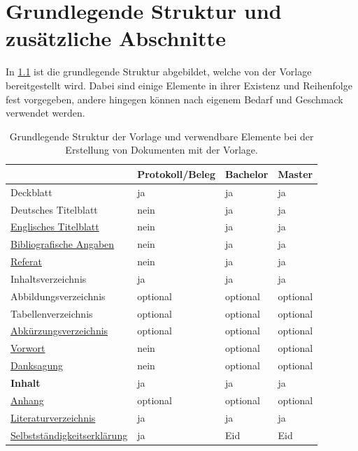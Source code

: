 	
\chapter{Grundlegende Struktur und zusätzliche Abschnitte}
\label{cha:additionalChapters}
In \cref{tab:documentStructure} ist die grundlegende Struktur abgebildet, welche von der Vorlage bereitgestellt wird. Dabei sind einige Elemente in ihrer Existenz und Reihenfolge fest vorgegeben, andere hingegen können nach eigenem Bedarf und Geschmack verwendet werden.
	
\begin{table}[!htb]
	\centering
	\caption{Grundlegende Struktur der Vorlage und verwendbare Elemente bei der Erstellung von Dokumenten mit der Vorlage.}
	\label{tab:documentStructure}
	\begin{tabular}{llll}
		\toprule
		& \textbf{Protokoll/Beleg} & \textbf{Bachelor} & \textbf{Master} \\
		\midrule
		Deckblatt & ja & ja & ja \\
		Deutsches Titelblatt & nein & ja & ja \\
		\hyperref[itm:englishTitle]{Englisches Titelblatt} & nein & ja & ja \\
		\hyperref[itm:bibliographicData]{Bibliografische Angaben} & nein & ja & ja \\
		\hyperref[itm:abstract]{Referat} & nein & ja & ja \\
		\cmidrule(r){1-1}
		\cmidrule(l){2-4}
		Inhaltsverzeichnis & ja & ja & ja \\
		Abbildungsverzeichnis & optional & optional & optional \\
		Tabellenverzeichnis & optional & optional & optional \\
		\hyperref[itm:acronyms]{Abkürzungsverzeichnis} & optional & optional & optional \\
		\cmidrule(r){1-1}
		\cmidrule(l){2-4}
		\hyperref[itm:preface]{Vorwort} & nein & optional & optional \\
		\hyperref[itm:dedication]{Danksagung} & nein & optional & optional \\
		\cmidrule(r){1-1}
		\cmidrule(l){2-4}
		\textbf{Inhalt} & ja & ja & ja \\
		\hyperref[itm:appendix]{Anhang} & optional & optional & optional \\
		\cmidrule(r){1-1}
		\cmidrule(l){2-4}
		\hyperref[itm:bibliography]{Literaturverzeichnis} & ja & ja & ja \\
\hyperref[itm:soa]{Selbstständigkeitserklärung} & ja & Eid & Eid \\
		\bottomrule
	\end{tabular}
\end{table}
	
